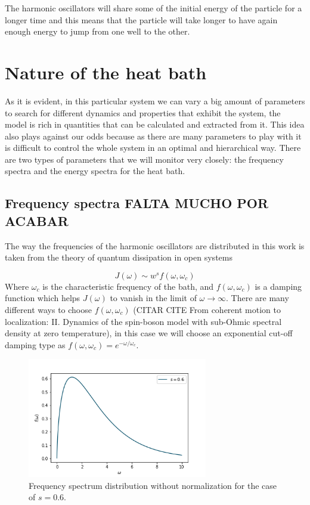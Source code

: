 The harmonic oscillators will share some of the initial energy of the particle for a longer time and  this means that the particle will take longer to have again enough energy to jump from one well to the other. 



\section{Nature of the heat bath}
As it is evident, in this particular system we can vary a big amount of parameters to search for different dynamics and properties that exhibit the system, the model is rich in quantities that can be calculated and extracted from it. This idea also plays against our odds because as there are many parameters to play with it is difficult to control the whole system in an optimal and hierarchical way. There are two types of parameters that we will monitor very closely: the frequency spectra and the energy spectra for the heat bath.


\subsection{Frequency spectra FALTA MUCHO POR ACABAR}
The way the frequencies of the harmonic oscillators are distributed in this work is taken from the theory of quantum dissipation in open systems

\begin{equation}
J(\omega) \sim w^s f(\omega,\omega_c)
\label{eq:spectral_density}
\end{equation}
Where $\omega_c$ is the characteristic frequency of the bath, and $f(\omega,\omega_c)$ is a damping function which helps $J(\omega)$ to vanish in the limit of $\omega \rightarrow \infty$. There are many different ways to choose $f(\omega,\omega_c)$ (CITAR CITE From coherent motion to localization: II. Dynamics of the spin-boson model
with sub-Ohmic spectral density at zero temperature), in this case we will choose an exponential cut-off damping type as $f(\omega,\omega_c)=e^{-\omega/\omega_c}$.   

\begin{figure}[H]
\centering
\includegraphics[width=0.7\textwidth]{Figures/frequency_spectra.png}
\caption{Frequency spectrum distribution without normalization for the case of $s=0.6$.\label{fig:frequency_spectra}
}
\end{figure} 


